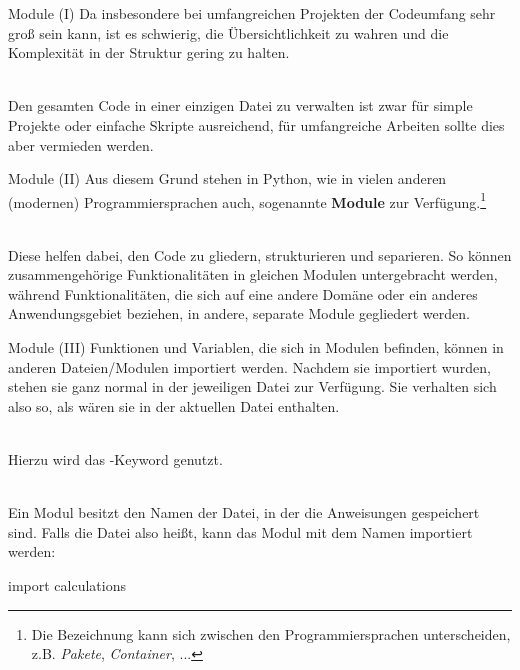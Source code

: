     \begin{frame}{Module (I)}
        Da insbesondere bei umfangreichen Projekten der Codeumfang sehr groß sein kann, ist es schwierig, die Übersichtlichkeit zu wahren und die Komplexität in der Struktur gering zu halten.\\~\
        
        Den gesamten Code in einer einzigen Datei zu verwalten ist zwar für simple Projekte oder einfache Skripte ausreichend, für umfangreiche Arbeiten sollte dies aber vermieden werden.
    \end{frame}
    
    \begin{frame}{Module (II)}
        Aus diesem Grund stehen in Python, wie in vielen anderen (modernen) Programmiersprachen auch, sogenannte \textbf{Module} zur Verfügung.\footnote{Die Bezeichnung kann sich zwischen den Programmiersprachen unterscheiden, z.B. \textit{Pakete}, \textit{Container}, ... } \\~\
        
        Diese helfen dabei, den Code zu gliedern, strukturieren und separieren. So können zusammengehörige Funktionalitäten in gleichen Modulen untergebracht werden, während Funktionalitäten, die sich auf eine andere Domäne oder ein anderes Anwendungsgebiet beziehen, in andere, separate Module gegliedert werden.
    \end{frame}
    
    \begin{frame}[fragile]{Module (III)}
        Funktionen und Variablen, die sich in Modulen befinden, können in anderen Dateien/Modulen importiert werden. Nachdem sie importiert wurden, stehen sie ganz normal in der jeweiligen Datei zur Verfügung. Sie verhalten sich also so, als wären sie in der aktuellen Datei enthalten.\\~\
        
        Hierzu wird das -Keyword genutzt. \\~\
        
        Ein Modul besitzt den Namen der Datei, in der die Anweisungen gespeichert sind. Falls die Datei also  heißt, kann das Modul mit dem Namen  importiert werden:
        
\begin{pythoncode}
import calculations
\end{pythoncode}
    \end{frame}
    
